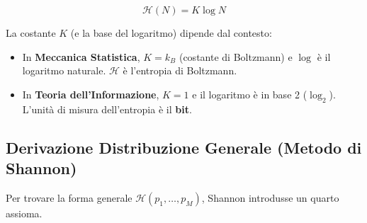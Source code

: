 \begin{tcolorbox}[colback=colorC!15, colframe=colorC!70!colorB,  title=\textbf{Entropia della Distribuzione Uniforme}]
\begin{equation}
    \mathcal{H}(N) = K \log N
    \label{eq:uniform_entropy}
\end{equation}
\end{tcolorbox}

La costante $K$ (e la base del logaritmo) dipende dal contesto:
\begin{itemize}
    \item In \textbf{Meccanica Statistica}, $K = k_B$ (costante di Boltzmann) e $\log$ è il logaritmo naturale. $\mathcal{H}$ è l'entropia di Boltzmann.
    \item In \textbf{Teoria dell'Informazione}, $K=1$ e il logaritmo è in base 2 ($\log_2$). L'unità di misura dell'entropia è il \textbf{bit}.
\end{itemize}

\subsection{Derivazione Distribuzione Generale (Metodo di Shannon)}

Per trovare la forma generale $\mathcal{H}(p_1, \dots, p_M)$, Shannon introdusse un quarto assioma.

